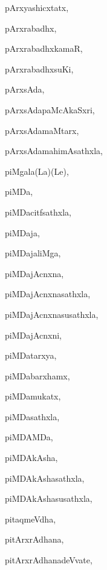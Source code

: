 \begin{multicols}{3}
{\noindent
{pArxyashicxtatx}, \pageref{pArxyashicxtatx}

\noindent
{pArxrabadhx}, \pageref{pArxrabadhx}

\noindent
{pArxrabadhxkamaR}, \pageref{pArxrabadhxkamaR}

\noindent
{pArxrabadhxsuKi}, \pageref{pArxrabadhxsuKi}

\noindent
{pArxsAda}, \pageref{pArxsAda}

\noindent
{pArxsAdapaMcAkaSxri}, \pageref{pArxsAdapaMcAkaSxri}

\noindent
{pArxsAdamaMtarx}, \pageref{pArxsAdamaMtarx}

\noindent
{pArxsAdamahimAsathxla}, \pageref{pArxsAdamahimAsathxla}

\noindent
{piMgala(La)(Le)}, \pageref{piMgalaLaLe}

\noindent
{piMDa}, \pageref{piMDa}

\noindent
{piMDacitfsathxla}, \pageref{piMDacitfsathxla}

\noindent
{piMDaja}, \pageref{piMDaja}

\noindent
{piMDajaliMga}, \pageref{piMDajaliMga}

\noindent
{piMDajAcnxna}, \pageref{piMDajAcnxna}

\noindent
{piMDajAcnxnasathxla}, \pageref{piMDajAcnxnasathxla}

\noindent
{piMDajAcnxnasusathxla}, \pageref{piMDajAcnxnasusathxla}

\noindent
{piMDajAcnxni}, \pageref{piMDajAcnxni}

\noindent
{piMDatarxya}, \pageref{piMDatarxya}

\noindent
{piMDabarxhamx}, \pageref{piMDabarxhamx}

\noindent
{piMDamukatx}, \pageref{piMDamukatx}

\noindent
{piMDasathxla}, \pageref{piMDasathxla}

\noindent
{piMDAMDa}, \pageref{piMDAMDa}

\noindent
{piMDAkAsha}, \pageref{piMDAkAsha}

\noindent
{piMDAkAshasathxla}, \pageref{piMDAkAshasathxla}

\noindent
{piMDAkAshasusathxla}, \pageref{piMDAkAshasusathxla}

\noindent
{pitaqmeVdha}, \pageref{pitaqmeVdha}

\noindent
{pitArxrAdhana}, \pageref{pitArxrAdhana}

\noindent
{pitArxrAdhanadeVvate}, \pageref{pitArxrAdhanadeVvate}

}
\end{multicols}
